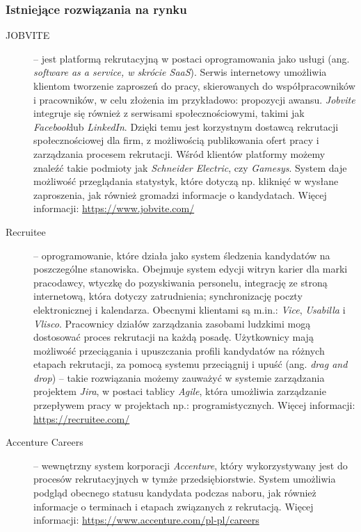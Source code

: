 \documentclass[twoside]{projektInzynierskiMS}
\numberwithin{figure}{section}
\begin{document}
\subsubsection{Istniejące rozwiązania na rynku}
\begin{description}
  \item[JOBVITE] -- jest platformą rekrutacyjną w postaci oprogramowania jako usługi (ang. \textit{software as a service, w skrócie SaaS}). Serwis internetowy umożliwia klientom tworzenie zaproszeń do pracy, skierowanych do współpracowników i pracowników, w celu złożenia im przykładowo: propozycji awansu. \textit{Jobvite} integruje się również z serwisami społecznościowymi, takimi jak \textit{Facebook}\linebreak lub \textit{LinkedIn}. Dzięki temu jest korzystnym dostawcą rekrutacji społecznościowej dla firm, z możliwością publikowania ofert pracy i zarządzania procesem rekrutacji. Wśród klientów platformy możemy znaleźć takie podmioty jak \textit{Schneider Electric}, czy \textit{Gamesys}. System daje możliwość przeglądania statystyk, które  dotyczą np. kliknięć w wysłane zaproszenia, jak również gromadzi informacje o kandydatach. \newline
  Więcej informacji: \url{https://www.jobvite.com/}
  \item[Recruitee] -- oprogramowanie, które działa jako system śledzenia kandydatów na poszczególne stanowiska. Obejmuje system edycji witryn karier dla marki pracodawcy, wtyczkę do pozyskiwania personelu, integrację ze stroną internetową, która dotyczy zatrudnienia; synchronizację poczty elektronicznej i kalendarza. Obecnymi klientami są m.in.: \textit{Vice}, \textit{Usabilla} i \textit{Vlisco}. Pracownicy działów zarządzania zasobami ludzkimi mogą dostosować proces rekrutacji na każdą posadę. Użytkownicy mają możliwość przeciągania i upuszczania profili kandydatów na różnych etapach rekrutacji, za pomocą systemu przeciągnij i upuść (ang. \textit{drag and drop}) – takie rozwiązania możemy zauważyć w systemie zarządzania projektem \textit{Jira}, w postaci tablicy \textit{Agile}, która umożliwia zarządzanie przepływem pracy w projektach np.: programistycznych. \newline
  Więcej informacji: \url{https://recruitee.com/}
  \item[Accenture Careers] -- wewnętrzny system korporacji \textit{Accenture}, który wykorzystywany jest do procesów rekrutacyjnych w tymże przedsiębiorstwie. System umożliwia podgląd obecnego statusu kandydata podczas naboru, jak również informacje o terminach i etapach związanych z rekrutacją. \newline
  Więcej informacji: \url{https://www.accenture.com/pl-pl/careers}
\end{description}
\end{document}
